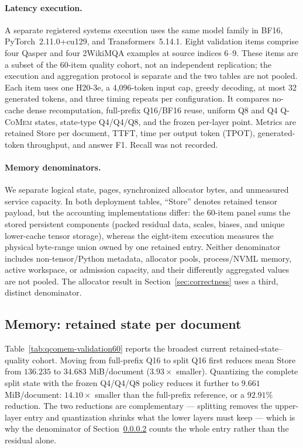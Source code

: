\documentclass{article}
\newcommand{\qcomem}{\textsc{Q-CoMem}}
\begin{document}
\paragraph{Latency execution.}
A separate registered systems execution uses the same model family in BF16,
PyTorch~2.11.0+cu129, and Transformers~5.14.1.  Eight validation items comprise
four Qasper and four 2WikiMQA examples at source indices 6--9.  These items are
a subset of the 60-item quality cohort, not an independent replication; the
execution and aggregation protocol is separate and the two tables are not
pooled.  Each item uses one H20-3e, a 4,096-token input cap, greedy decoding, at
most 32 generated tokens, and three timing repeats per configuration.  It
compares no-cache dense recomputation,
full-prefix Q16/BF16 reuse, uniform Q8 and Q4 \qcomem{} states, state-type
Q4/Q4/Q8, and the frozen per-layer point.  Metrics are retained Store per
document, TTFT, time per output token (TPOT), generated-token throughput, and
answer F1.  Recall was not recorded.

\paragraph{Memory denominators.}
\label{sec:denominators}
We separate logical state, pages, synchronized allocator bytes, and unmeasured
service capacity.  In both deployment tables, ``Store'' denotes retained tensor
payload, but the accounting implementations differ: the 60-item panel sums the
stored persistent components (packed residual data, scales, biases, and unique
lower-cache tensor storage), whereas the eight-item execution measures the
physical byte-range union owned by one retained entry.  Neither denominator
includes non-tensor/Python metadata, allocator pools, process/NVML memory,
active workspace, or admission capacity, and their differently aggregated
values are not pooled.  The allocator result in
Section~\ref{sec:correctness} uses a third, distinct denominator.

\subsection{Memory: retained state per document}
\label{sec:memory}

Table~\ref{tab:qcomem-validation60} reports the broadest current
retained-state--quality cohort.  Moving from full-prefix Q16 to split Q16 first
reduces mean Store from $136.235$ to $34.683$ MiB/document ($3.93\times$
smaller).  Quantizing the complete split state with the frozen Q4/Q4/Q8 policy
reduces it further to $9.661$ MiB/document: $14.10\times$ smaller than the
full-prefix reference, or a $92.91\%$ reduction.  The two reductions are
complementary --- splitting removes the upper-layer entry and quantization
shrinks what the lower layers must keep --- which is why the denominator of
Section~\ref{sec:denominators} counts the whole entry rather than the residual
alone.
\end{document}
